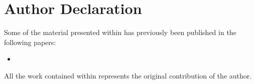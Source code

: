\chapter*{Author Declaration}
Some of the material presented within has previously been published in the
following papers:

\begin{itemize}
  \item {}
\end{itemize}

\flushleft
All the work contained within represents the original contribution of the
author.